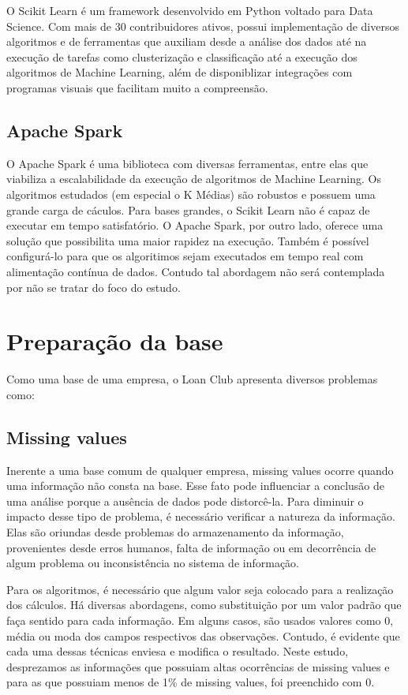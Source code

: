 O Scikit Learn é um framework desenvolvido em Python voltado para Data Science. Com mais de 30 contribuidores ativos, possui implementação de diversos algoritmos e de ferramentas que auxiliam desde a análise dos dados até na execução de tarefas como clusterização e classificação até a execução dos algoritmos de Machine Learning, além de disponiblizar integrações com programas visuais que facilitam muito a compreensão. 


\subsection{Apache Spark}

O Apache Spark é uma biblioteca com diversas ferramentas, entre elas que viabiliza a escalabilidade da execução de algoritmos de Machine Learning. Os algoritmos estudados (em especial o K Médias) são robustos e possuem uma grande carga de cáculos. Para bases grandes, o Scikit Learn não é capaz de executar em tempo satisfatório. O Apache Spark, por outro lado, oferece uma solução que possibilita uma maior rapidez na execução. Também é possível configurá-lo para que os algoritimos sejam executados em tempo real com alimentação contínua de dados. Contudo tal abordagem não será contemplada por não se tratar do foco do estudo.

\section{Preparação da base}

Como uma base de uma empresa, o Loan Club apresenta diversos problemas como:

\subsection{Missing values}
Inerente a uma base comum de qualquer empresa, missing values ocorre quando uma informação não consta na base. Esse fato pode influenciar a conclusão de uma análise porque a ausência de dados pode distorcê-la. Para diminuir o impacto desse tipo de problema, é necessário verificar a natureza da informação. Elas são oriundas desde problemas do armazenamento da informação, provenientes desde erros humanos, falta de informação ou em decorrência de algum problema ou inconsistência no sistema de informação.

Para os algoritmos, é necessário que algum valor seja colocado para a realização dos cálculos. Há diversas abordagens, como substituição por um valor padrão que faça sentido para cada informação. Em alguns casos, são usados valores como 0, média ou moda dos campos respectivos das observações. Contudo, é evidente que cada uma dessas técnicas enviesa e modifica o resultado. Neste estudo, desprezamos as informações que possuiam altas ocorrências de missing values e para as que possuiam menos de 1\% de missing values, foi preenchido com 0. 

